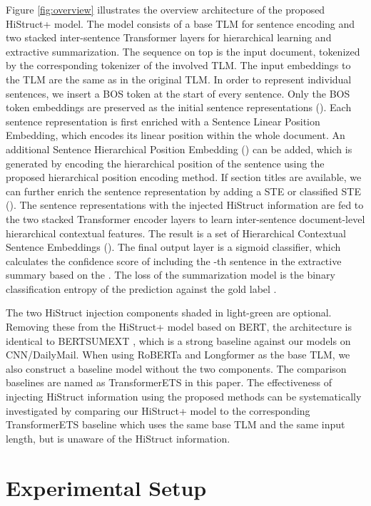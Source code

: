\documentclass[11pt]{article}
\begin{document}
Figure \ref{fig:overview} illustrates the overview architecture of the proposed HiStruct+ model. The model consists of a base TLM for sentence encoding and two stacked inter-sentence Transformer layers for hierarchical learning and extractive summarization. The sequence on top is the input document, tokenized by the corresponding tokenizer of the involved TLM. The input embeddings to the TLM are the same as in the original TLM. In order to represent individual sentences, we insert a BOS token at the start of every sentence. 
Only the BOS token embeddings are preserved as the initial sentence representations (). Each sentence representation is first enriched with a Sentence Linear Position Embedding, which encodes its linear position within the whole document. An additional Sentence Hierarchical Position Embedding () can be added, which is generated by encoding the hierarchical position of the sentence using the proposed hierarchical position encoding method. If section titles are available, we can further enrich the sentence representation by adding a STE or classified STE (). The sentence representations with the injected HiStruct information are fed to the two stacked Transformer encoder layers to learn inter-sentence document-level hierarchical contextual features. 
The result is a set of Hierarchical Contextual Sentence Embeddings (). The final output layer is a sigmoid classifier, which calculates the confidence score  of including the -th sentence in the extractive summary based on the . The loss of the summarization model is the binary classification entropy of the prediction  against the gold label .

The two HiStruct injection components shaded in light-green are optional. Removing these from the HiStruct+ model based on BERT, the architecture is identical to BERTSUMEXT \cite{presumm}, which is a strong baseline against our models on CNN/DailyMail. When using RoBERTa and Longformer as the base TLM, we also construct a baseline model without the two components. The comparison baselines are named as TransformerETS in this paper. The effectiveness of injecting HiStruct information using the proposed methods can be systematically investigated by comparing our HiStruct+ model to the corresponding TransformerETS baseline which uses the same base TLM and the same input length, but is unaware of the HiStruct information.

\section{Experimental Setup}
\label{sec:Experiments}
\end{document}
